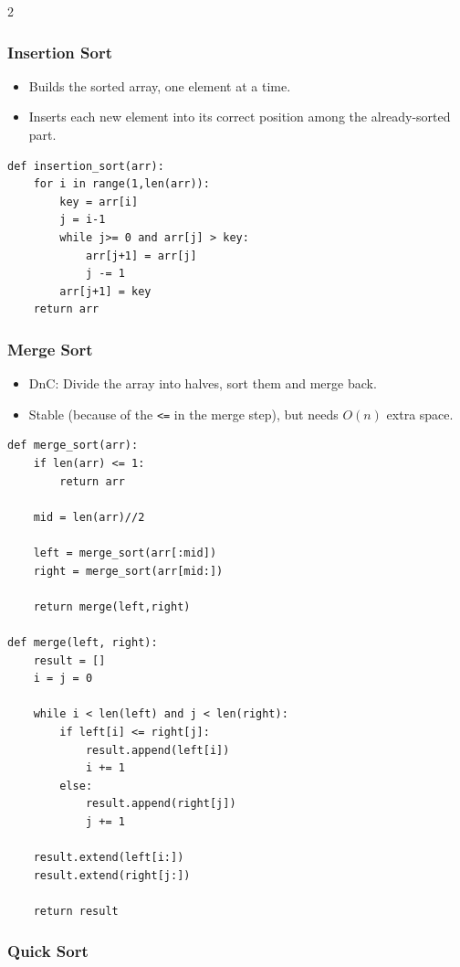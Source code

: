 \documentclass[9pt,a4paper]{extarticle}
\begin{document}
\begin{multicols}{2}
\subsubsection{Insertion Sort}

\begin{itemize}
\item Builds the sorted array, one element at a time.
\item Inserts each new element into its correct position among the already-sorted part.
\end{itemize}

\begin{lstlisting}
def insertion_sort(arr):
    for i in range(1,len(arr)):
        key = arr[i]
        j = i-1
        while j>= 0 and arr[j] > key:
            arr[j+1] = arr[j]
            j -= 1
        arr[j+1] = key
    return arr
\end{lstlisting}

\subsubsection{Merge Sort}

\begin{itemize}
\item DnC: Divide the array into halves, sort them and merge back.
\item Stable (because of the \texttt{<=\allowbreak{}} in the merge step), but needs $O(n)$ extra space.
\end{itemize}

\begin{lstlisting}
def merge_sort(arr):
    if len(arr) <= 1:
        return arr

    mid = len(arr)//2

    left = merge_sort(arr[:mid])
    right = merge_sort(arr[mid:])

    return merge(left,right)

def merge(left, right):
    result = []
    i = j = 0

    while i < len(left) and j < len(right):
        if left[i] <= right[j]:
            result.append(left[i])
            i += 1
        else:
            result.append(right[j])
            j += 1

    result.extend(left[i:])
    result.extend(right[j:])

    return result
\end{lstlisting}

\subsubsection{Quick Sort}


\end{multicols}
\end{document}
